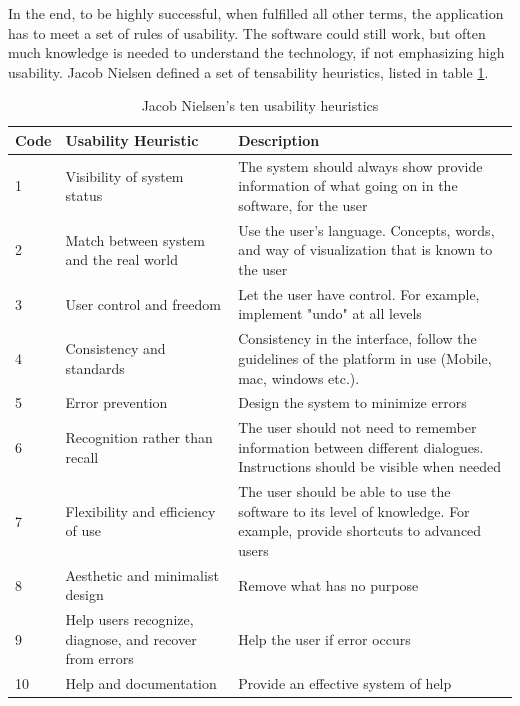 In the end, to be highly successful, when fulfilled all other terms, the application has to meet a set of rules of usability. The software could still work, but often much knowledge is needed to understand the technology, if not emphasizing high usability. Jacob Nielsen defined a set of tensability heuristics, listed in table \ref{tab:usability-heuristics}.

\begin{table}[h]
    \begin{tabular}{lp{}p{}}
        \toprule
        \textbf{Code} & \textbf{Usability Heuristic} & \textbf{Description} \\ \midrule
        1 & Visibility of system status             & The system should always show provide information of what going on in the software, for the user                         \\
        2 & Match between system and the real world & Use the user's language. Concepts, words, and way of visualization that is known to the user                             \\
        3    & User control and freedom                                & Let the user have control. For example, implement "undo" at all levels \\
        4 & Consistency and standards               & Consistency in the interface, follow the guidelines of the platform in use (Mobile, mac, windows etc.).                  \\
        5    & Error prevention                                        & Design the system to minimize errors                                   \\
        6 & Recognition rather than recall          & The user should not need to remember information between different dialogues. Instructions should be visible when needed \\
        7 & Flexibility and efficiency of use       & The user should be able to use the software to its level of knowledge. For example, provide shortcuts to advanced users  \\
        8    & Aesthetic and minimalist design                         & Remove what has no purpose                                             \\
        9    & Help users recognize, diagnose, and recover from errors & Help the user if error occurs                                          \\
        10   & Help and documentation                                  & Provide an effective system of help                                    \\ \bottomrule
    \end{tabular}
    \caption{Jacob Nielsen's ten usability heuristics}
    \label{tab:usability-heuristics}
\end{table}

